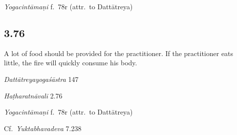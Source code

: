 \begin{ekdosis}
\begin{testimonia}[hp03_075]
\emph{Yogacintāmaṇi} f.~78r (attr.~to Dattātreya)
\begin{versinnote}
\end{versinnote}
\end{testimonia}



\subsection*{3.76}
\begin{translation}[hp03_076]
A lot of food should be provided for the practitioner. If the practitioner eats little, the fire will quickly consume his body.
\end{translation}

\begin{sources}[hp03_076]
\emph{Dattātreyayogaśāstra} 147
\begin{versinnote}
\end{versinnote}
\end{sources}

\begin{testimonia}[hp03_076]

\emph{Haṭharatnāvalī} 2.76
\begin{versinnote}
\end{versinnote}

\emph{Yogacintāmaṇi} f.~78r (attr.~to Dattātreya)
\begin{versinnote}
\end{versinnote}

Cf.~\emph{Yuktabhavadeva} 7.238
\begin{versinnote}
\end{versinnote}
\end{testimonia}


\end{ekdosis}
